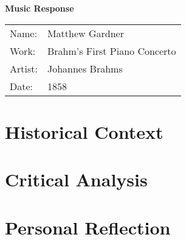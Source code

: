 \documentclass[onecolumn, 12pt]{article}
\title{}
\author{Matthew Gardner}
\date{}
\begin{document}
\textbf{Music Response}

\begin{tabular}{ll}
  Name:&Matthew Gardner \\
  Work:&Brahm's First Piano Concerto \\
  Artist:&Johannes Brahms \\
  Date:&1858 \\
\end{tabular}

\section*{Historical Context}

\section*{Critical Analysis}

\section*{Personal Reflection}
\end{document}
